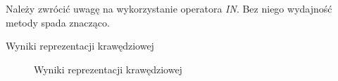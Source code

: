 
Należy zwrócić uwagę na wykorzystanie operatora \emph{IN}. Bez niego wydajność metody spada znacząco. 




\begin{table}[h!]
  \caption{Wyniki reprezentacji krawędziowej}
  \begin{center}
  \end{center}
\end{table}

\begin{figure}[h!t]
  \caption{Wyniki reprezentacji krawędziowej}
  \label{fig:img_chart_simple}
  \begin{center}
  \end{center}
\end{figure}

\clearpage



